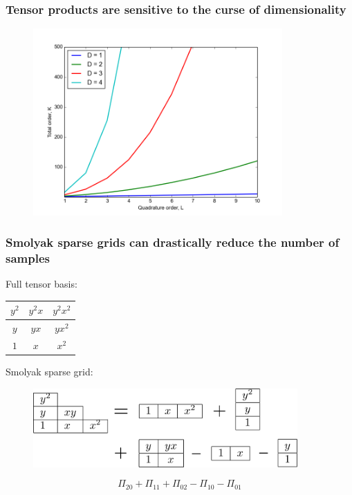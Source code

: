 \documentclass{beamer}
\begin{document}


\begin{frame}
 \frametitle{Tensor products are sensitive to the curse of dimensionality}
 \begin{figure}
  \includegraphics[width=0.85\textwidth]{dimensionality_nodes.png}
 \end{figure}
\end{frame}

\begin{frame}
 \frametitle{Smolyak sparse grids can drastically reduce the
 number of samples}
 \pause
Full tensor basis:
\begin{table}
 \begin{tabular}{|c|c|c|}\hline
 $y^2$&$y^2x$&$y^2x^2$\\\hline
 $y$&$yx$&$yx^2$\\\hline
 $1$&$x$&$x^2$\\\hline
 \end{tabular}
\end{table}
\pause
Smolyak sparse grid:
 \begin{figure}
  \includegraphics[width=0.9\textwidth]{smolyak2.png}
 \end{figure}
\[\Pi_{20} + \Pi_{11} + \Pi_{02} - \Pi_{10} - \Pi_{01}\]
\end{frame}
\end{document}
